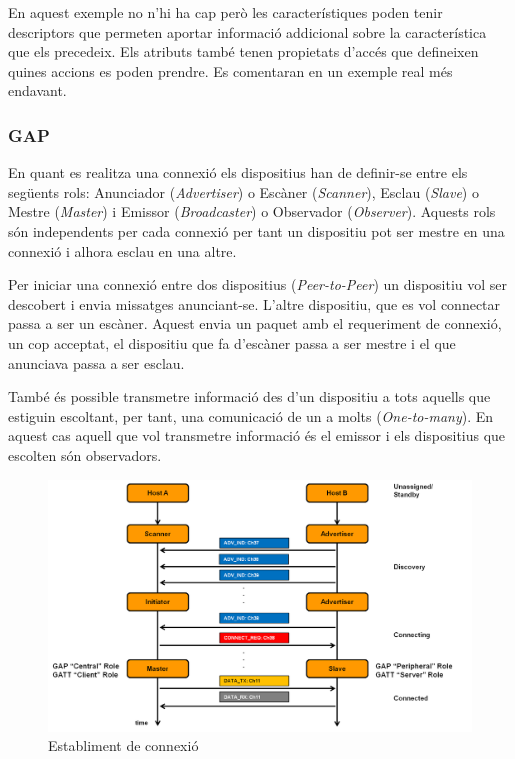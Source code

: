 En aquest exemple no n'hi ha cap però les característiques poden tenir descriptors \cite{descriptors} que permeten aportar informació addicional sobre la característica que els precedeix.
Els atributs també tenen propietats d'accés que defineixen quines accions es poden prendre.
Es comentaran en un exemple real més endavant. %

\subsubsection{GAP}
En quant es realitza una connexió els dispositius han de definir-se entre els següents rols: Anunciador (\textit{Advertiser}) o Escàner (\textit{Scanner}), Esclau (\textit{Slave}) o Mestre (\textit{Master}) i Emissor (\textit{Broadcaster}) o Observador (\textit{Observer}).
Aquests rols són independents per cada connexió per tant un dispositiu pot ser mestre en una connexió i alhora esclau en una altre.

Per iniciar una connexió entre dos dispositius (\textit{Peer-to-Peer}) un dispositiu vol ser descobert i envia missatges anunciant-se.
L'altre dispositiu, que es vol connectar passa a ser un escàner.
Aquest envia un paquet amb el requeriment de connexió, un cop acceptat, el dispositiu que fa d'escàner passa a ser mestre i el que anunciava passa a ser esclau.

També és possible transmetre informació des d'un dispositiu a tots aquells que estiguin escoltant, per tant, una comunicació de un a molts (\textit{One-to-many}).
En aquest cas aquell que vol transmetre informació és el emissor i els dispositius que escolten són observadors.

\begin{figure}[h]
	\begin{center}
		\includegraphics[width=1\textwidth]{./images/rols_unicast.png}
		\caption{Establiment de connexió}
	\end{center}
\end{figure}



